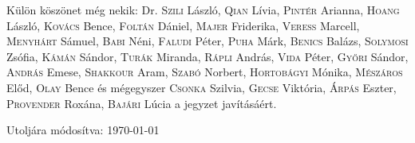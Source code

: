 \documentclass[a4paper,11.5pt]{article}
\begin{document}
	Külön köszönet még nekik: Dr. \textsc{Szili} László, \textsc{Qian} Lívia, \textsc{Pintér} Arianna, \textsc{Hoang} László, \textsc{Kovács} Bence, \textsc{Foltán} Dániel,\textsc{ Majer} Friderika, \textsc{Veress} Marcell, \textsc{Menyhárt} Sámuel, \textsc{Babi} Néni, \textsc{Faludi} Péter, \textsc{Puha} Márk,\textsc{ Benics} Balázs, \textsc{Solymosi} Zsófia, \textsc{Kámán} Sándor, \textsc{Turák} Miranda, \textsc{Rápli} András, \textsc{Vida} Péter, \textsc{Győri} Sándor, \textsc{András} Emese, \textsc{Shakkour} Aram, \textsc{Szabó} Norbert, \textsc{Hortobágyi} Mónika, \textsc{Mészáros} Előd, \textsc{Olay} Bence és mégegyszer \textsc{Csonka} Szilvia, \textsc{Gecse} Viktória, \textsc{Árpás} Eszter, \textsc{Provender} Roxána, \textsc{Bajári} Lúcia a jegyzet javításáért.
	
	\bigskip
	Utoljára módosítva: \today
\end{document}
